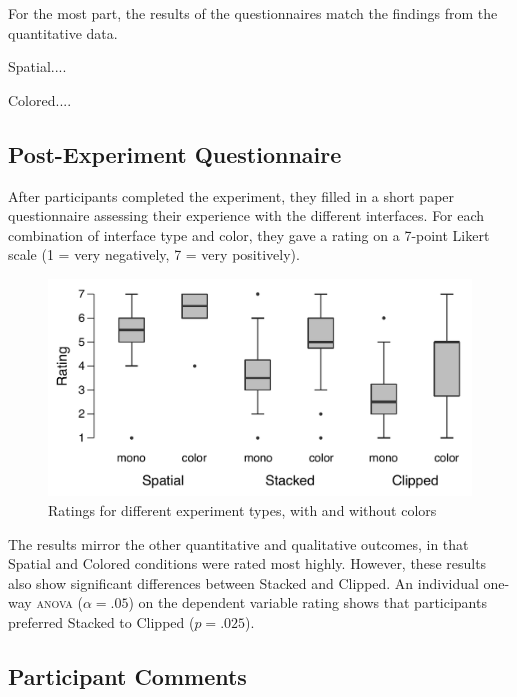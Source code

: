 \documentclass{tufte-book} %
\begin{document}
For the most part, the results of the questionnaires match the findings from the quantitative data.

Spatial....

Colored....

\subsection{Post-Experiment Questionnaire}
After participants completed the experiment, they filled in a short paper questionnaire assessing their experience with the different interfaces. For each combination of interface type and color, they gave a rating on a 7-point Likert scale (1 = very negatively, 7 = very positively).

\begin{figure}
  \includegraphics{post-color.pdf}
  \caption{Ratings for different experiment types, with and without colors}
  \label{fig:post-color}
\end{figure}

The results mirror the other quantitative and qualitative outcomes, in that Spatial and Colored conditions were rated most highly. However, these results also show significant differences between Stacked and Clipped. An individual one-way \textsc{anova} ($\alpha = .05$) on the dependent variable rating shows that participants preferred Stacked to Clipped ($p = .025$).


\subsection{Participant Comments}


\end{document}

